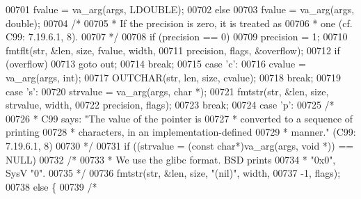 \begin{DoxyCode}
{{{{00701                     fvalue = va\_arg(args, LDOUBLE);
00702                 \textcolor{keywordflow}{else}
00703                     fvalue = va\_arg(args, \textcolor{keywordtype}{double});
00704                 \textcolor{comment}{/*}
00705 \textcolor{comment}{                 * If the precision is zero, it is treated as}
00706 \textcolor{comment}{                 * one (cf. C99: 7.19.6.1, 8).}
00707 \textcolor{comment}{                 */}
00708                 \textcolor{keywordflow}{if} (precision == 0)
00709                     precision = 1;
00710                 fmtflt(str, &len, size, fvalue, width,
00711                     precision, flags, &overflow);
00712                 \textcolor{keywordflow}{if} (overflow)
00713                     \textcolor{keywordflow}{goto} out;
00714                 \textcolor{keywordflow}{break};
00715             \textcolor{keywordflow}{case} \textcolor{charliteral}{'c'}:
00716                 cvalue = va\_arg(args, \textcolor{keywordtype}{int});
00717                 OUTCHAR(str, len, size, cvalue);
00718                 \textcolor{keywordflow}{break};
00719             \textcolor{keywordflow}{case} \textcolor{charliteral}{'s'}:
00720                 strvalue = va\_arg(args, \textcolor{keywordtype}{char} *);
00721                 fmtstr(str, &len, size, strvalue, width,
00722                     precision, flags);
00723                 \textcolor{keywordflow}{break};
00724             \textcolor{keywordflow}{case} \textcolor{charliteral}{'p'}:
00725                 \textcolor{comment}{/*}
00726 \textcolor{comment}{                 * C99 says: "The value of the pointer is}
00727 \textcolor{comment}{                 * converted to a sequence of printing}
00728 \textcolor{comment}{                 * characters, in an implementation-defined}
00729 \textcolor{comment}{                 * manner." (C99: 7.19.6.1, 8)}
00730 \textcolor{comment}{                 */}
00731                 \textcolor{keywordflow}{if} ((strvalue = (\textcolor{keyword}{const} \textcolor{keywordtype}{char}*)va\_arg(args, \textcolor{keywordtype}{void} *)) == NULL)
00732                     \textcolor{comment}{/*}
00733 \textcolor{comment}{                     * We use the glibc format.  BSD prints}
00734 \textcolor{comment}{                     * "0x0", SysV "0".}
00735 \textcolor{comment}{                     */}
00736                     fmtstr(str, &len, size, \textcolor{stringliteral}{"(nil)"}, width,
00737                         -1, flags);
00738                 \textcolor{keywordflow}{else} \{
00739                     \textcolor{comment}{/*}
}}}}
\end{DoxyCode}
